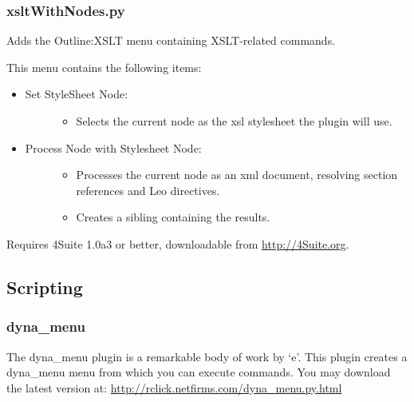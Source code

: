 \documentclass[a4paper,10pt,english]{sphinxmanual}
\begin{document}
\subsubsection{xsltWithNodes.py}
\label{plugins:xsltwithnodes-py}
Adds the Outline:XSLT menu containing XSLT-related commands.

This menu contains the following items:
\begin{itemize}
\item {} \begin{description}
\item[{Set StyleSheet Node:}] \leavevmode\begin{itemize}
\item {} 
Selects the current node as the xsl stylesheet the plugin will use.

\end{itemize}

\end{description}

\item {} \begin{description}
\item[{Process Node with Stylesheet Node:}] \leavevmode\begin{itemize}
\item {} 
Processes the current node as an xml document,
resolving section references and Leo directives.

\item {} 
Creates a sibling containing the results.

\end{itemize}

\end{description}

\end{itemize}

Requires 4Suite 1.0a3 or better, downloadable from \href{http://4Suite.org}{http://4Suite.org}.


\subsection{Scripting}
\label{plugins:scripting}

\subsubsection{dyna\_menu}
\label{plugins:dyna-menu}
The dyna\_menu plugin is a remarkable body of work by `e'.
This plugin creates a dyna\_menu menu from which you can execute commands.
You may download the latest version at: \href{http://rclick.netfirms.com/dyna\_menu.py.html}{http://rclick.netfirms.com/dyna\_menu.py.html}
\end{document}
